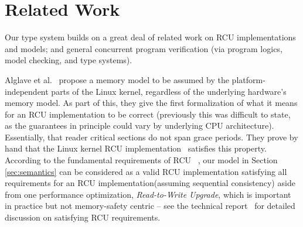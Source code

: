 \section{Related Work}
\label{sec:relatedwork}
Our type system builds on a great deal of related work on RCU implementations and models; and general concurrent program verification (via program logics, model checking, and type systems).

Alglave et al.~\cite{Alglave:2018:FSC:3173162.3177156} propose a memory model to be assumed by the platform-independent parts of the Linux kernel, regardless of the underlying hardware's memory model.
As part of this, they give the first formalization of what it means for an RCU implementation to be correct (previously this was difficult to state, as the guarantees in principle could vary by underlying CPU architecture). Essentially, that reader critical sections do not span grace periods. They prove by hand that the Linux kernel RCU implementation~\cite{DBLP:conf/cav/AlglaveKT13} satisfies this property. According to the fundamental requirements of \textsf{RCU} ~\cite{abssem}, our model in Section \ref{sec:semantics} can be considered as a valid RCU implementation satisfying all requirements for an RCU implementation(assuming sequential consistency) aside from one performance optimization, \textit{Read-to-Write Upgrade}, which is important in practice but not memory-safety centric -- see the technical report~\cite{isotek} for detailed discussion on satisfying RCU requirements.
